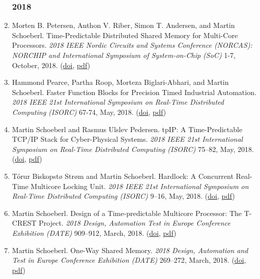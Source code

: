 \begin{enumerate}
\subsubsection*{2018}

\item Morten B. Petersen, Anthon V. Riber, Simon T. Andersen, and Martin Schoeberl.
 Time-Predictable Distributed Shared Memory for Multi-Core Processors.
 \emph{2018 IEEE Nordic Circuits and Systems Conference (NORCAS): NORCHIP and International Symposium of System-on-Chip (SoC)} 1-7, October, 2018.
(\href{http://dx.doi.org/10.1109/NORCHIP.2018.8573463}{doi}, \href{http://www.jopdesign.com/doc/tpdistmen.pdf}{pdf})

\item Hammond Pearce, Partha Roop, Morteza Biglari-Abhari, and Martin Schoeberl.
 Faster Function Blocks for Precision Timed Industrial Automation.
 \emph{2018 IEEE 21st International Symposium on Real-Time Distributed Computing (ISORC)} 67-74, May, 2018.
(\href{http://dx.doi.org/10.1109/ISORC.2018.00017}{doi}, \href{https://www.jopdesign.com/doc/funblock_isorc2018.pdf}{pdf})

\item Martin Schoeberl and Rasmus Ulslev Pedersen.
 tpIP: A Time-Predictable TCP/IP Stack for Cyber-Physical Systems.
 \emph{2018 IEEE 21st International Symposium on Real-Time Distributed Computing (ISORC)} 75--82, May, 2018.
(\href{http://dx.doi.org/10.1109/ISORC.2018.00018}{doi}, \href{http://www.jopdesign.com/doc/iotprot.pdf}{pdf})

\item T{\'o}rur Biskopst{\o} Str{\o}m and Martin Schoeberl.
 Hardlock: A Concurrent Real-Time Multicore Locking Unit.
 \emph{2018 IEEE 21st International Symposium on Real-Time Distributed Computing (ISORC)} 9--16, May, 2018.
(\href{http://dx.doi.org/10.1109/ISORC.2018.00010}{doi}, \href{https://www.jopdesign.com/doc/hardlock.pdf}{pdf})

\item Martin Schoeberl.
 Design of a Time-predictable Multicore Processor: The T-CREST Project.
 \emph{2018 Design, Automation Test in Europe Conference Exhibition (DATE)} 909--912, March, 2018.
(\href{http://dx.doi.org/10.23919/DATE.2018.8342138}{doi}, \href{https://www.jopdesign.com/doc/t-crest-cont.pdf}{pdf})

\item Martin Schoeberl.
 One-Way Shared Memory.
 \emph{2018 Design, Automation and Test in Europe Conference Exhibition (DATE)} 269--272, March, 2018.
(\href{http://dx.doi.org/10.23919/DATE.2018.8342017}{doi}, \href{https://www.jopdesign.com/doc/onewaymem.pdf}{pdf})


\end{enumerate}
